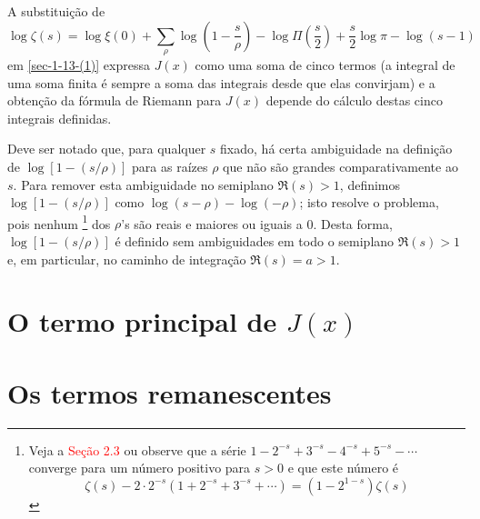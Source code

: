     A substituição de 
    \begin{equation*}
        \log \zeta(s) = \log \xi(0) + \sum_{\rho} \log \left( 1 - \frac{s}{\rho} \right) - \log \Pi \left( \frac{s}{2} \right) + \frac{s}{2} \log \pi - \log (s-1)
    \end{equation*}
    em \eqref{sec-1-13-(1)} expressa $J(x)$ como uma soma de cinco termos (a integral de uma soma finita é sempre a soma das integrais desde que elas convirjam) e a obtenção da fórmula de Riemann para $J(x)$ depende do cálculo destas cinco integrais definidas.
    
    Deve ser notado que, para qualquer $s$ fixado, há certa ambiguidade na definição de $\log [1 - (s/\rho)]$ para as raízes $\rho$ que não são grandes comparativamente ao $s$. Para remover esta ambiguidade no semiplano $\Re(s) > 1$, definimos $\log [1 - (s/\rho)]$ como $\log (s - \rho) - \log (-\rho)$; isto resolve o problema, pois nenhum
    \footnote{Veja a \textcolor{red}{Seção 2.3} ou observe que a série $1 - 2^{-s} + 3^{-s} - 4^{-s} + 5^{-s} - \cdots$ converge para um número positivo para $s>0$ e que este número é 
    \begin{equation*}
        \zeta(s) - 2 \cdot 2^{-s} ( 1 + 2^{-s} + 3^{-s} + \cdots) = (1 - 2^{1 - s})\zeta(s)
    \end{equation*}
    }
    dos $\rho$'s são reais e maiores ou iguais a 0. Desta forma, $\log [1 - (s/\rho)]$ é definido sem ambiguidades em todo o semiplano $\Re(s) > 1$ e, em particular, no caminho de integração $\Re(s) = a > 1$.

    
    \section{O termo principal de $J(x)$} \label{sec-1-14}
    
    
    
    
    \section{Os termos remanescentes} \label{sec-1-16}
    
    
    
    
    
    
    
    
    
    
    
    
    
    
    
    













